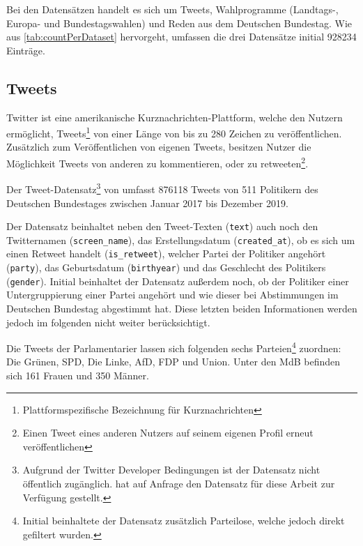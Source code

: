 
Bei den Datensätzen handelt es sich um Tweets, Wahlprogramme (Landtags-, Europa- und Bundestagswahlen) und Reden aus dem Deutschen Bundestag. Wie aus \autoref{tab:countPerDataset} hervorgeht, umfassen die drei Datensätze initial \num{928234} Einträge. 

\subsection*{Tweets}


Twitter ist eine amerikanische Kurznachrichten-Plattform, welche den Nutzern ermöglicht, Tweets\footnote{Plattformspezifische Bezeichnung für Kurznachrichten} von einer Länge von bis zu 280 Zeichen zu veröffentlichen. Zusätzlich zum Veröffentlichen von eigenen Tweets, besitzen Nutzer die Möglichkeit Tweets von anderen zu kommentieren, oder zu retweeten\footnote{Einen Tweet eines anderen Nutzers auf seinem eigenen Profil erneut veröffentlichen}.

Der Tweet-Datensatz\footnote{Aufgrund der Twitter Developer Bedingungen ist der Datensatz nicht öffentlich zugänglich. \citeauthor{saltzer_finding_2022} hat auf Anfrage den Datensatz für diese Arbeit zur Verfügung gestellt.} von \textcite{saltzer_finding_2022} umfasst \num{876118} Tweets von \num{511} Politikern des Deutschen Bundestages zwischen Januar \num{2017} bis Dezember \num{2019}. 

Der Datensatz beinhaltet neben den Tweet-Texten (\texttt{text}) auch noch den Twitternamen (\texttt{screen\_name}), das Erstellungsdatum (\texttt{created\_at}), ob es sich um einen Retweet handelt (\texttt{is\_retweet}), welcher Partei der Politiker angehört (\texttt{party}), das Geburtsdatum (\texttt{birthyear}) und das Geschlecht des Politikers (\texttt{gender}). Initial beinhaltet der Datensatz außerdem noch, ob der Politiker einer Untergruppierung einer Partei angehört und wie dieser bei Abstimmungen im Deutschen Bundestag abgestimmt hat. Diese letzten beiden Informationen werden jedoch im folgenden nicht weiter berücksichtigt.

Die Tweets der Parlamentarier lassen sich folgenden sechs Parteien\footnote{Initial beinhaltete der Datensatz zusätzlich Parteilose, welche jedoch direkt gefiltert wurden.} zuordnen: Die Grünen, \ac{SPD}, Die Linke, \ac{AfD}, \ac{FDP} und Union. Unter den \ac{MdB} befinden sich \num{161} Frauen und \num{350} Männer.

